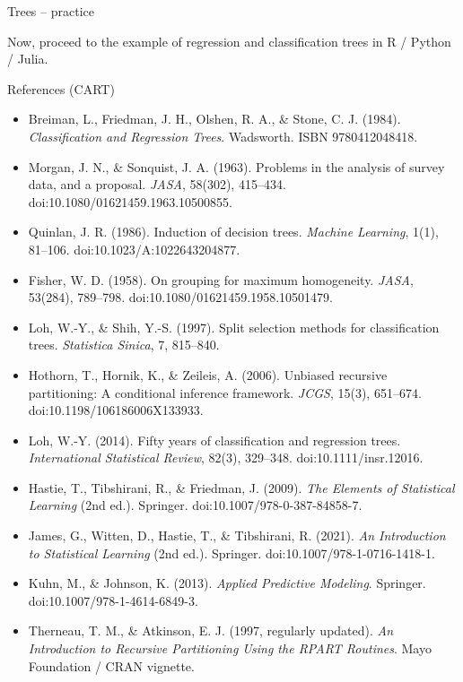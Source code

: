 \documentclass[10pt,ignorenonframetext,aspectratio=169]{beamer}
\begin{document}
\begin{frame}{Trees -- practice}
\begin{center}
Now, proceed to the example of regression and classification trees in R / Python / Julia.
\end{center}
\end{frame}


\begin{frame}{References (CART)}
\tiny
\begin{itemize}
    \item Breiman, L., Friedman, J. H., Olshen, R. A., \& Stone, C. J. (1984). \textit{Classification and Regression Trees}. Wadsworth. ISBN 9780412048418.
    \item Morgan, J. N., \& Sonquist, J. A. (1963). Problems in the analysis of survey data, and a proposal. \textit{JASA}, 58(302), 415--434. doi:10.1080/01621459.1963.10500855.
    \item Quinlan, J. R. (1986). Induction of decision trees. \textit{Machine Learning}, 1(1), 81--106. doi:10.1023/A:1022643204877.
    \item Fisher, W. D. (1958). On grouping for maximum homogeneity. \textit{JASA}, 53(284), 789--798. doi:10.1080/01621459.1958.10501479.
    \item Loh, W.-Y., \& Shih, Y.-S. (1997). Split selection methods for classification trees. \textit{Statistica Sinica}, 7, 815--840.
    \item Hothorn, T., Hornik, K., \& Zeileis, A. (2006). Unbiased recursive partitioning: A conditional inference framework. \textit{JCGS}, 15(3), 651--674. doi:10.1198/106186006X133933.
    \item Loh, W.-Y. (2014). Fifty years of classification and regression trees. \textit{International Statistical Review}, 82(3), 329--348. doi:10.1111/insr.12016.
    \item Hastie, T., Tibshirani, R., \& Friedman, J. (2009). \textit{The Elements of Statistical Learning} (2nd ed.). Springer. doi:10.1007/978-0-387-84858-7.
    \item James, G., Witten, D., Hastie, T., \& Tibshirani, R. (2021). \textit{An Introduction to Statistical Learning} (2nd ed.). Springer. doi:10.1007/978-1-0716-1418-1.
    \item Kuhn, M., \& Johnson, K. (2013). \textit{Applied Predictive Modeling}. Springer. doi:10.1007/978-1-4614-6849-3.
    \item Therneau, T. M., \& Atkinson, E. J. (1997, regularly updated). \textit{An Introduction to Recursive Partitioning Using the RPART Routines}. Mayo Foundation / CRAN vignette.

\end{itemize}
\end{frame}
\end{document}
